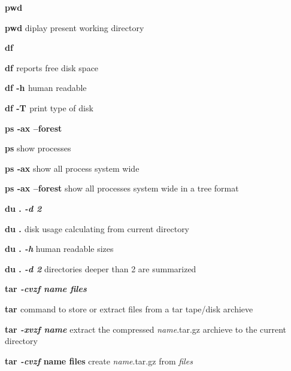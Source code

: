 \documentclass[a4paper,11pt,twoside]{article}
\begin{document}
\vspace{1mm}

\begin{labeling}{\textbf{pwd}}
\item [\textbf{pwd }] diplay present working directory
\end{labeling}

\vspace{1mm}

\begin{labeling}{\textbf{df \textit{}}}
\item [\textbf{df \textit{}}] reports free disk space
\item [\textbf{df -h \textit{}}] human readable
\item [\textbf{df -T \textit{}}] print type of disk
\end{labeling}

\vspace{1mm}

\begin{labeling}{\textbf{ps -ax --forest}}
\item [\textbf{ps }] show processes
\item [\textbf{ps -ax }] show all process system wide
\item [\textbf{ps -ax --forest}] show all processes system wide in a tree format
\end{labeling}

\vspace{1mm}

\begin{labeling}{\textbf{du . \textit{-d 2}}}
\item [\textbf{du . \textit{}}] disk usage calculating from current directory 
\item [\textbf{du . \textit{-h}}] human readable sizes
\item [\textbf{du . \textit{-d 2}}] directories deeper than 2 are summarized
\end{labeling}

\vspace{1mm}

\begin{labeling}{\textbf{tar \textit{-cvzf name files}}}
\item [\textbf{tar \textit{}}] command to store or extract files from a tar tape/disk archieve
\item [\textbf{tar \textit{-xvzf name}}] extract the compressed \textit{name}.tar.gz archieve to the current directory   
\item [\textbf{tar \textit{-cvzf} name files}] create \textit{name}.tar.gz from \textit{files}
\end{labeling}
\end{document}
